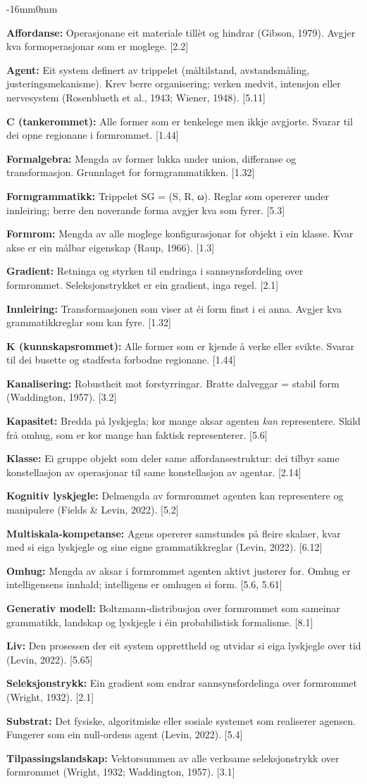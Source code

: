 \documentclass[10pt,oneside]{book}
\newcommand{\msym}[1]{{\mathfbfont #1}}
\newcommand{\silentchapter}[2]{%
  \clearpage
  \markboth{#2}{}%
  \addcontentsline{toc}{chapter}{#1}%
}
\newenvironment{ordliste}{%
  \begingroup\footnotesize\setlength{\parskip}{0.3pt plus 0.1pt}%
  \linespread{0.92}\selectfont
}{%
  \endgroup
}
\newcommand{\ordlisteentry}[2]{%
  \par\addvspace{1.5pt}%
  \noindent\textbf{#1:} #2\par%
}
\newenvironment{widebody}{%
  \begin{adjustwidth}{-16mm}{0mm}%
}{%
  \end{adjustwidth}%
}
\begin{document}
\silentchapter{Ordliste}{ordliste}
\begin{widebody}
\begin{ordliste}
\ordlisteentry{Affordanse}{Operasjonane eit materiale tillèt og hindrar (Gibson, 1979). Avgjer kva formoperasjonar som er moglege. [2.2]}
\ordlisteentry{Agent}{Eit system definert av trippelet (måltilstand, avstandsmåling, justeringsmekanisme). Krev berre organisering; verken medvit, intensjon eller nervesystem (Rosenblueth et al., 1943; Wiener, 1948). [5.11]}
\ordlisteentry{C (tankerommet)}{Alle former som er tenkelege men ikkje avgjorte. Svarar til dei opne regionane i formrommet. [1.44]}
\ordlisteentry{Formalgebra}{Mengda av former lukka under union, differanse og transformasjon. Grunnlaget for formgrammatikken. [1.32]}
\ordlisteentry{Formgrammatikk}{Trippelet SG = (S, R, \msym{ω}). Reglar som opererer under innleiring; berre den noverande forma avgjer kva som fyrer. [5.3]}
\ordlisteentry{Formrom}{Mengda av alle moglege konfigurasjonar for objekt i ein klasse. Kvar akse er ein målbar eigenskap (Raup, 1966). [1.3]}
\ordlisteentry{Gradient}{Retninga og styrken til endringa i sannsynsfordeling over formrommet. Seleksjonstrykket er ein gradient, inga regel. [2.1]}
\ordlisteentry{Innleiring}{Transformasjonen som viser at éi form finst i ei anna. Avgjer kva grammatikkreglar som kan fyre. [1.32]}
\ordlisteentry{K (kunnskapsrommet)}{Alle former som er kjende å verke eller svikte. Svarar til dei busette og stadfesta forbodne regionane. [1.44]}
\ordlisteentry{Kanalisering}{Robustheit mot forstyrringar. Bratte dalveggar = stabil form (Waddington, 1957). [3.2]}
\ordlisteentry{Kapasitet}{Bredda på lyskjegla; kor mange aksar agenten \textit{kan} representere. Skild frå omhug, som er kor mange han faktisk representerer. [5.6]}
\ordlisteentry{Klasse}{Ei gruppe objekt som deler same affordansestruktur: dei tilbyr same konstellasjon av operasjonar til same konstellasjon av agentar. [2.14]}
\ordlisteentry{Kognitiv lyskjegle}{Delmengda av formrommet agenten kan representere og manipulere (Fields \& Levin, 2022). [5.2]}
\ordlisteentry{Multiskala-kompetanse}{Agens opererer samstundes på fleire skalaer, kvar med si eiga lyskjegle og sine eigne grammatikkreglar (Levin, 2022). [6.12]}
\ordlisteentry{Omhug}{Mengda av aksar i formrommet agenten aktivt justerer for. Omhug er intelligensens innhald; intelligens er omhugen si form. [5.6, 5.61]}
\ordlisteentry{Generativ modell}{Boltzmann-distribusjon over formrommet som sameinar grammatikk, landskap og lyskjegle i éin probabilistisk formalisme. [8.1]}
\ordlisteentry{Liv}{Den prosessen der eit system opprettheld og utvidar si eiga lyskjegle over tid (Levin, 2022). [5.65]}
\ordlisteentry{Seleksjonstrykk}{Ein gradient som endrar sannsynsfordelinga over formrommet (Wright, 1932). [2.1]}
\ordlisteentry{Substrat}{Det fysiske, algoritmiske eller sosiale systemet som realiserer agensen. Fungerer som ein null-ordens agent (Levin, 2022). [5.4]}
\ordlisteentry{Tilpassingslandskap}{Vektorsummen av alle verksame seleksjonstrykk over formrommet (Wright, 1932; Waddington, 1957). [3.1]}
\end{ordliste}
\end{widebody}
\end{document}
